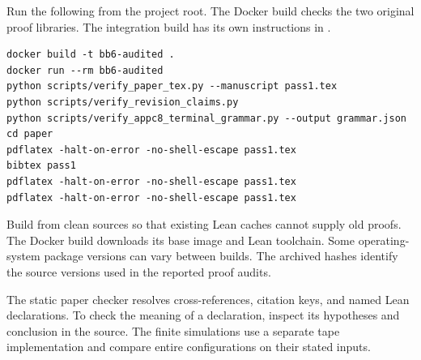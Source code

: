 \documentclass[11pt]{article}
\DeclareRobustCommand{\_}{\ifmmode\sb\else\textunderscore\allowbreak\fi}
\theoremstyle{definition}
\theoremstyle{remark}
\begin{document}
\noindent\begin{minipage}{\linewidth}
Run the following from the project root. The Docker build checks the two original proof libraries. The integration build has its own instructions in .
\begin{lstlisting}
docker build -t bb6-audited .
docker run --rm bb6-audited
python scripts/verify_paper_tex.py --manuscript pass1.tex
python scripts/verify_revision_claims.py
python scripts/verify_appc8_terminal_grammar.py --output grammar.json
cd paper
pdflatex -halt-on-error -no-shell-escape pass1.tex
bibtex pass1
pdflatex -halt-on-error -no-shell-escape pass1.tex
pdflatex -halt-on-error -no-shell-escape pass1.tex
\end{lstlisting}
\end{minipage}
Build from clean sources so that existing Lean caches cannot supply old proofs. The Docker build downloads its base image and Lean toolchain. Some operating-system package versions can vary between builds. The archived hashes identify the source versions used in the reported proof audits.

The static paper checker resolves cross-references, citation keys, and named Lean declarations. To check the meaning of a declaration, inspect its hypotheses and conclusion in the source. The finite simulations use a separate tape implementation and compare entire configurations on their stated inputs.

\par\bigskip


\end{document}
